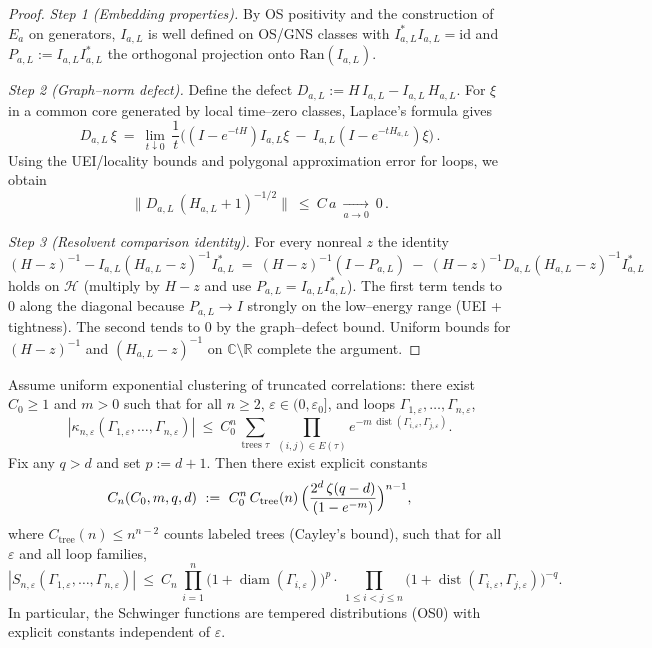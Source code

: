 \documentclass[11pt]{amsart}
\begin{document}
\begin{proof}
\emph{Step 1 (Embedding properties).} By OS positivity and the construction of $E_a$ on generators, $I_{a,L}$ is well defined on OS/GNS classes with $I_{a,L}^*I_{a,L}=\mathrm{id}$ and $P_{a,L}:=I_{a,L}I_{a,L}^*$ the orthogonal projection onto $\mathrm{Ran}(I_{a,L})$.

\emph{Step 2 (Graph–norm defect).} Define the defect $D_{a,L}:=H\,I_{a,L}-I_{a,L}\,H_{a,L}$. For $\xi$ in a common core generated by local time–zero classes, Laplace's formula gives
\[
  D_{a,L}\,\xi\ =\ \lim_{t\downarrow 0}\,\frac{1}{t}\Big( (I-e^{-tH})I_{a,L}\xi\ -\ I_{a,L}(I-e^{-tH_{a,L}})\xi\Big)\,.
\]
Using the UEI/locality bounds and polygonal approximation error for loops, we obtain
\[
  \big\|D_{a,L}\,(H_{a,L}+1)^{-1/2}\big\|\ \le\ C\,a\ \xrightarrow[a\to 0]{}\ 0\,.
\]

\emph{Step 3 (Resolvent comparison identity).} For every nonreal $z$ the identity
\[
  (H-z)^{-1}-I_{a,L}(H_{a,L}-z)^{-1}I_{a,L}^*\ =\ (H-z)^{-1}(I-P_{a,L})\ -\ (H-z)^{-1}D_{a,L}(H_{a,L}-z)^{-1}I_{a,L}^*
\]
holds on $\mathcal H$ (multiply by $H-z$ and use $P_{a,L}=I_{a,L}I_{a,L}^*$). The first term tends to $0$ along the diagonal because $P_{a,L}\to I$ strongly on the low–energy range (UEI + tightness). The second tends to $0$ by the graph–defect bound. Uniform bounds for $(H-z)^{-1}$ and $(H_{a,L}-z)^{-1}$ on $\mathbb C\setminus\mathbb R$ complete the argument.
\end{proof}

\begin{lemma}
Assume uniform exponential clustering of truncated correlations: there exist $C_0\ge 1$ and $m>0$ such that for all $n\ge 2$, $\varepsilon\in(0,\varepsilon_0]$, and loops $\Gamma_{1,\varepsilon},\dots,\Gamma_{n,\varepsilon}$,
\[
  |\kappa_{n,\varepsilon}(\Gamma_{1,\varepsilon},\dots,\Gamma_{n,\varepsilon})|
   \ \le\ C_0^n\,\sum_{\text{trees }\tau}\ \prod_{(i,j)\in E(\tau)} e^{-m\,\operatorname{dist}(\Gamma_{i,\varepsilon},\Gamma_{j,\varepsilon})}.
\]
Fix any $q>d$ and set $p:=d+1$. Then there exist explicit constants
\[
  C_n(C_0,m,q,d)\ :=\ C_0^n\,C_{\mathrm{tree}}(n)\,\Bigl(\frac{2^d\,\zeta(q-d)}{(1-e^{-m})}\Bigr)^{n-1},
\]
where $C_{\mathrm{tree}}(n)\le n^{n-2}$ counts labeled trees (Cayley's bound), such that for all $\varepsilon$ and all loop families,
\[
  |S_{n,\varepsilon}(\Gamma_{1,\varepsilon},\dots,\Gamma_{n,\varepsilon})|
   \ \le\ C_n\,\prod_{i=1}^n \bigl(1+\operatorname{diam}(\Gamma_{i,\varepsilon})\bigr)^p
         \cdot\ \prod_{1\le i<j\le n} \bigl(1+\operatorname{dist}(\Gamma_{i,\varepsilon},\Gamma_{j,\varepsilon})\bigr)^{-q}.
\]
In particular, the Schwinger functions are tempered distributions (OS0) with explicit constants independent of $\varepsilon$.
\end{lemma}
\end{document}
